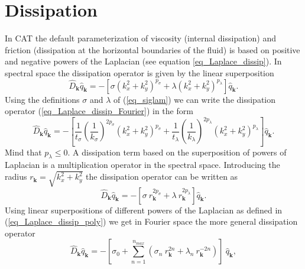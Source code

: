 \section{Dissipation} 
\label{sec_dissipation}
%
In CAT the default parameterization of viscosity (internal dissipation) 
and friction (dissipation at the horizontal boundaries of the fluid) 
is based on positive and negative powers of the Laplacian 
(see equation \ref{eq_Laplace_dissip}). In spectral space the dissipation
operator is given by the linear superposition
\begin{equation} \label{eq_Laplace_dissip_Fourier}
   \hat{D}_{\mathbf{k}}  \hat{q}_{\mathbf{k}}
    = - \left[
         \sigma \left(k_{x}^{2} + k_{y}^{2} \right)^{p_{\sigma}}
            + 
         \lambda \left(k_{x}^{2} + k_{y}^{2} \right)^{p_{\lambda}}
        \right]
        \hat{q}_{\mathbf{k}}.
\end{equation}
Using the definitions $\sigma$ and $\lambda$ of (\ref{eq_siglam})
we can write the dissipation operator (\ref{eq_Laplace_dissip_Fourier})
in the form
\begin{equation} \label{eq_Laplace_dissip_Fourier2}
   \hat{D}_{\mathbf{k}}  \hat{q}_{\mathbf{k}}
    = - \left[
         \frac{1}{t_{\sigma}} 
         \left(\frac{1}{k_{\sigma}}\right)^{2 p_{\sigma}}  
         \left(k_{x}^{2} + k_{y}^{2} \right)^{p_{\sigma}}
          + 
         \frac{1}{t_{\lambda}} 
         \left(\frac{1}{k_{\lambda}}\right)^{2 p_{\lambda}}
         \left(k_{x}^{2} + k_{y}^{2} \right)^{p_{\lambda}}
        \right]
        \hat{q}_{\mathbf{k}}.
\end{equation}
Mind that $p_{\lambda} \le 0$. A dissipation term based on
the superposition of powers of Laplacian is a multiplication
operator in the spectral space. Introducing the radius 
$r_{\mathbf{k}} = \sqrt{k^{2}_{x} + k^{2}_{y}}$ the dissipation 
operator can be written as  
\begin{equation} \label{eq_Laplace_dissip_Fourier3}
   \hat{D}_{\mathbf{k}}  \hat{q}_{\mathbf{k}}
    = 
   - \left[
       \sigma \ r^{2 p_{\sigma}}_{\mathbf{k}}
        +
       \lambda \ r^{2 p_{\lambda}}_{\mathbf{k}}
    \right]  
     \hat{q}_{\mathbf{k}}.
\end{equation}     
Using linear superpositions of different powers of the Laplacian as
defined in (\ref{eq_Laplace_dissip_poly}) we get in Fourier space
the more general dissipation operator
\begin{equation} \label{eq_Laplace_dissip_poly_Fourier}
  \hat{D}_{\mathbf{k}}  \hat{q}_{\mathbf{k}}
   =
  -
  \left[
   \sigma_{0} 
    +
   \sum_{n=1}^{n_{max}} 
    \left(
     \sigma_{n} \ r^{2n}_{\mathbf{k}}
      + 
     \lambda_{n} \ r^{-2n}_{\mathbf{k}}
    \right)
  \right] \ 
  \hat{q}_{\mathbf{k}},
\end{equation}
